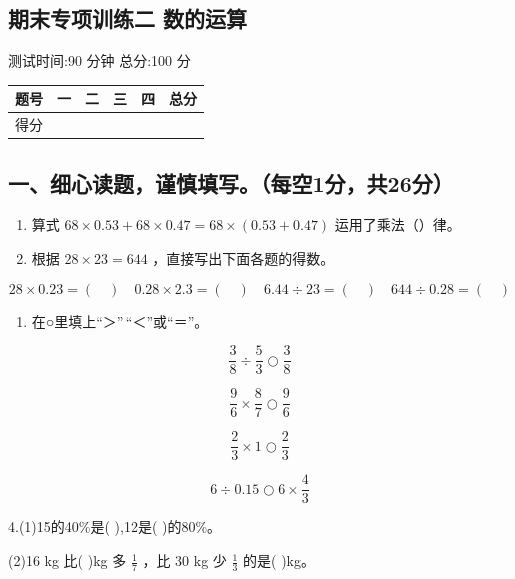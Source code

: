 \documentclass[
  10
]{article}
\author{}
\date{}
\newcounter{none} %
\providecommand{\tightlist}{%
  \setlength{\itemsep}{0pt}\setlength{\parskip}{0pt}}
\begin{document}
\subsection{期末专项训练二
数的运算}\label{ux671fux672bux4e13ux9879ux8badux7ec3ux4e8c-ux6570ux7684ux8fd0ux7b97}

测试时间:90 分钟 总分:100 分

{\def\LTcaptype{none} %
\begin{longtable}[]{@{}|l|l|l|l|l|l|@{}}
\toprule\noalign{}
\endhead
\bottomrule\noalign{}
\endlastfoot
\hline
题号 & 一 & 二 & 三 & 四 & 总分 \\
\hline
得分 & & & & & \\
\hline
\end{longtable}
}

\subsection{一、细心读题，谨慎填写。（每空1分，共26分）}\label{ux4e00ux7ec6ux5fc3ux8bfbux9898ux8c28ux614eux586bux5199ux6bcfux7a7a1ux5206ux517126ux5206}

\begin{enumerate}
\def\labelenumi{\arabic{enumi}.}
\item
  算式 \(68 \times 0.53 + 68 \times 0.47 = 68 \times (0.53 + 0.47)\)
  运用了乘法（）律。
\item
  根据 \(28 \times 23 = 644\) ，直接写出下面各题的得数。
\end{enumerate}

\[
2 8 \times 0. 2 3 = (\quad) \quad 0. 2 8 \times 2. 3 = (\quad) \quad 6. 4 4 \div 2 3 = (\quad) \quad 6 4 4 \div 0. 2 8 = (\quad)
\]

\begin{enumerate}
\def\labelenumi{\arabic{enumi}.}
\setcounter{enumi}{2}
\tightlist
\item
  在○里填上``＞''\,``＜''或``＝''。
\end{enumerate}

\[
\frac {3}{8} \div \frac {5}{3} \bigcirc \frac {3}{8}
\]

\[
\frac {9}{6} \times \frac {8}{7} \bigcirc \frac {9}{6}
\]

\[
\frac {2}{3} \times 1 \bigcirc \frac {2}{3}
\]

\[
6 \div 0. 1 5 \bigcirc 6 \times \frac {4}{3}
\]

4.(1)15的40\%是( ),12是( )的80\%。

(2)16 kg 比( )kg 多 \(\frac{1}{7}\) ，比 30 kg 少 \(\frac{1}{3}\) 的是(
)kg。
\end{document}
